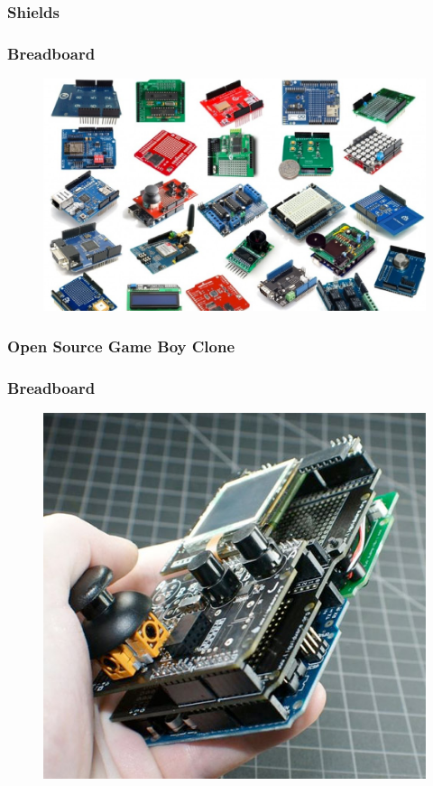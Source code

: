 \begin{frame}
	\frametitle{Shields}
	\frametitle{Breadboard}
	\begin{figure}
		\includegraphics[scale=.28]{assets/shields} 
	\end{figure}
\end{frame}

\begin{frame}
	\frametitle{Open Source Game Boy Clone}
	\frametitle{Breadboard}
	\begin{figure}
		\includegraphics[scale=.32]{assets/gameboy} 
	\end{figure}
\end{frame}



